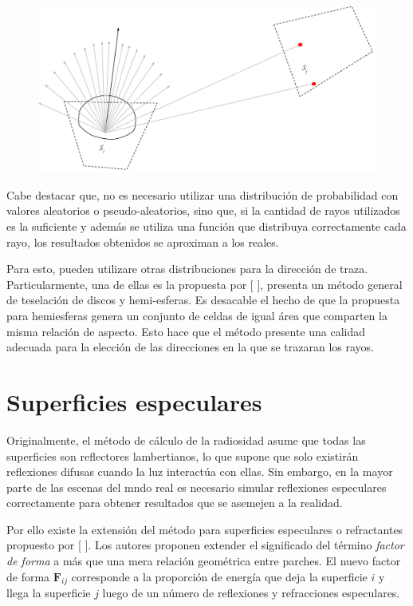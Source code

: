 \vspace{5mm}
\begin{figure}[H]
	\centering
	\includegraphics[width=\linewidth]{assets/Raytracing}
	\label{img:ff}
\end{figure}

Cabe destacar que, no es necesario utilizar una distribución de probabilidad con valores aleatorios o pseudo-aleatorios, sino que, si la cantidad de rayos utilizados es la suficiente y además se utiliza una función que distribuya correctamente cada rayo, los resultados obtenidos se aproximan a los reales.

Para esto, pueden utilizare otras distribuciones para la dirección de traza. Particularmente, una de ellas es la propuesta por [\citeauthor{Beckers} \cite{Beckers}], presenta un método general de teselación de discos y hemi-esferas. Es desacable el hecho de que la propuesta para hemiesferas genera un conjunto de celdas de igual área que comparten la misma relación de aspecto. Esto hace que el método presente una calidad adecuada para la elección de las direcciones en la que se trazaran los rayos.

\section{Superficies especulares}

Originalmente, el método de cálculo de la radiosidad asume que todas las superficies son reflectores lambertianos, lo que supone que solo existirán reflexiones difusas cuando la luz interactúa con ellas. Sin embargo, en la mayor parte de las escenas del mndo real es necesario simular reflexiones especulares correctamente para obtener resultados que se asemejen a la realidad.

Por ello existe la extensión del método para superficies especulares o refractantes propuesto por [\citeauthor{Sillion} \cite{Sillion}]. Los autores proponen extender el significado del término \textit{factor de forma} a más que una mera relación geométrica entre parches. El nuevo factor de forma $\mathbf{F}_{ij}$ corresponde a la proporción de energía que deja la superficie $i$ y llega la superficie $j$ luego de un número de reflexiones y refracciones especulares.

